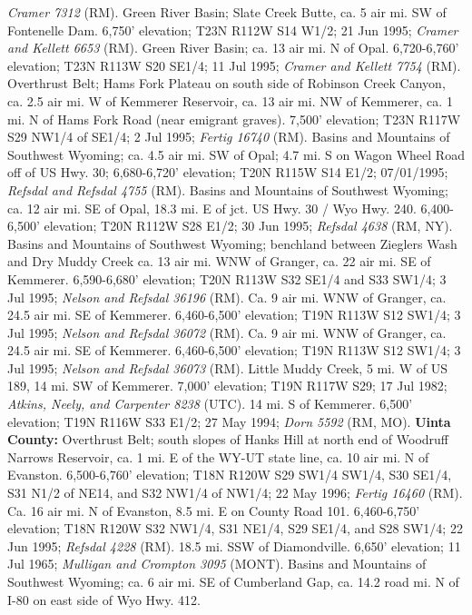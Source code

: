 \textit{Cramer 7312} (RM).
Green River Basin; Slate Creek Butte, ca. 5 air mi. SW of Fontenelle Dam.
6,750' elevation; T23N R112W S14 W1/2; 21 Jun 1995;
\textit{Cramer and Kellett 6653} (RM).
Green River Basin; ca. 13 air mi. N of Opal. 6,720-6,760' elevation;
T23N R113W S20 SE1/4; 11 Jul 1995; \textit{Cramer and Kellett 7754} (RM).
Overthrust Belt; Hams Fork Plateau on south side of Robinson Creek Canyon, ca.
2.5 air mi. W of Kemmerer Reservoir, ca. 13 air mi. NW of Kemmerer, ca. 1 mi. N
of Hams Fork Road (near emigrant graves). 7,500' elevation;
T23N R117W S29 NW1/4 of SE1/4; 2 Jul 1995; \textit{Fertig 16740} (RM).
Basins and Mountains of Southwest Wyoming; ca. 4.5 air mi. SW of Opal; 4.7 mi. S
on Wagon Wheel Road off of US Hwy. 30; 6,680-6,720' elevation;
T20N R115W S14 E1/2; 07/01/1995; \textit{Refsdal and Refsdal 4755} (RM).
Basins and Mountains of Southwest Wyoming; ca. 12 air mi. SE of Opal, 18.3 mi. E
of jct. US Hwy. 30 / Wyo Hwy. 240. 6,400-6,500' elevation; T20N R112W S28 E1/2;
30 Jun 1995; \textit{Refsdal 4638} (RM, NY).
Basins and Mountains of Southwest Wyoming; benchland between Zieglers Wash and
Dry Muddy Creek ca. 13 air mi. WNW of Granger, ca. 22 air mi. SE of Kemmerer.
6,590-6,680' elevation; T20N R113W S32 SE1/4 and S33 SW1/4; 3 Jul 1995;
\textit{Nelson and Refsdal 36196} (RM).
Ca. 9 air mi. WNW of Granger, ca. 24.5 air mi. SE of Kemmerer.
6,460-6,500' elevation; T19N R113W S12 SW1/4; 3 Jul 1995;
\textit{Nelson and Refsdal 36072} (RM).
Ca. 9 air mi. WNW of Granger, ca. 24.5 air mi. SE of Kemmerer.
6,460-6,500' elevation; T19N R113W S12 SW1/4; 3 Jul 1995;
\textit{Nelson and Refsdal 36073} (RM).
Little Muddy Creek, 5 mi. W of US 189, 14 mi. SW of Kemmerer. 7,000' elevation;
T19N R117W S29; 17 Jul 1982; \textit{Atkins, Neely, and Carpenter 8238} (UTC).
14 mi. S of Kemmerer. 6,500' elevation; T19N R116W S33 E1/2; 27 May 1994;
\textit{Dorn 5592} (RM, MO).
  \textbf{Uinta County:}
Overthrust Belt; south slopes of Hanks Hill at north end of Woodruff Narrows
Reservoir, ca. 1 mi. E of the WY-UT state line, ca. 10 air mi. N of Evanston.
6,500-6,760' elevation; T18N R120W S29 SW1/4 SW1/4, S30 SE1/4, S31 N1/2 of NE14,
and S32 NW1/4 of NW1/4; 22 May 1996; \textit{Fertig 16460} (RM).
Ca. 16 air mi. N of Evanston, 8.5 mi. E on County Road 101.
6,460-6,750' elevation; T18N R120W S32 NW1/4, S31 NE1/4, S29 SE1/4, and
S28 SW1/4; 22 Jun 1995; \textit{Refsdal 4228} (RM).
18.5 mi. SSW of Diamondville. 6,650’ elevation; 11 Jul 1965;
\textit{Mulligan and Crompton 3095} (MONT).
Basins and Mountains of Southwest Wyoming; ca. 6 air mi. SE of Cumberland Gap,
ca. 14.2 road mi. N of I-80 on east side of Wyo Hwy. 412.
